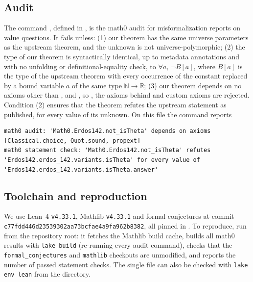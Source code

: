 \documentclass[11pt]{amsart}
\theoremstyle{plain}
\theoremstyle{definition}
\newcommand{\N}{\mathbb{N}}
\newcommand{\R}{\mathbb{R}}
\begin{document}
\subsection*{Audit}
The command , defined in , is the math0 audit for misformalization reports on value questions. It fails unless:
(1) our theorem has the same universe parameters as the upstream theorem, and the unknown is not universe-polymorphic;
(2) the type of our theorem is syntactically identical, up to metadata annotations and with no unfolding or definitional-equality check, to $\forall a,\ \neg B[a]$, where $B[a]$ is the type of the upstream theorem with every occurrence of the constant  replaced by a bound variable $a$ of the same type $\N\to\R$;
(3) our theorem depends on no axioms other than ,  and , so , the axioms behind  and custom axioms are rejected.
Condition (2) ensures that the theorem refutes the upstream statement as published, for every value of its unknown. On this file the command reports
\begin{lstlisting}
math0 audit: 'Math0.Erdos142.not_isTheta' depends on axioms [Classical.choice, Quot.sound, propext]
math0 statement check: 'Math0.Erdos142.not_isTheta' refutes 'Erdos142.erdos_142.variants.isTheta' for every value of 'Erdos142.erdos_142.variants.isTheta.answer'
\end{lstlisting}

\subsection*{Toolchain and reproduction}
We use Lean~4 \cite{Lean4} \texttt{v4.33.1}, Mathlib \cite{Mathlib} \texttt{v4.33.1} and formal-conjectures \cite{FC} at commit \texttt{c77fdd446d23539302aa73bcfae4a9fa962b8382}, all pinned in .
To reproduce, run  from the repository root: it fetches the Mathlib build cache, builds all math0 results with \texttt{lake build} (re-running every audit command), checks that the \texttt{formal\_conjectures} and \texttt{mathlib} checkouts are unmodified, and reports the number of passed statement checks.
The single file can also be checked with \texttt{lake env lean} from the  directory.
\end{document}
